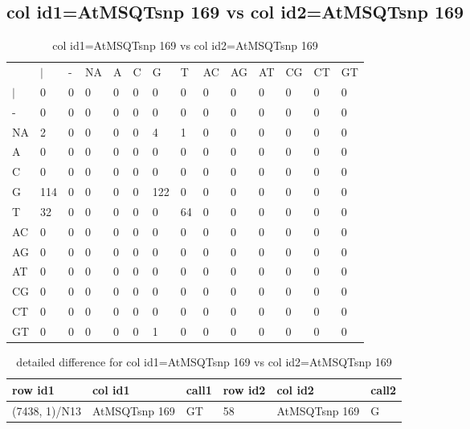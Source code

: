 \subsection{col id1=AtMSQTsnp 169 vs col id2=AtMSQTsnp 169}
\begin{center}
\begin{longtable}{|l|l|l|l|l|l|l|l|l|l|l|l|l|l|}
\caption{col id1=AtMSQTsnp 169 vs col id2=AtMSQTsnp 169} \label{table_dm736}\\
\hline
\\
\hline
&$|$&-&NA&A&C&G&T&AC&AG&AT&CG&CT&GT\\
$|$&0&0&0&0&0&0&0&0&0&0&0&0&0\\
-&0&0&0&0&0&0&0&0&0&0&0&0&0\\
NA&2&0&0&0&0&4&1&0&0&0&0&0&0\\
A&0&0&0&0&0&0&0&0&0&0&0&0&0\\
C&0&0&0&0&0&0&0&0&0&0&0&0&0\\
G&114&0&0&0&0&122&0&0&0&0&0&0&0\\
T&32&0&0&0&0&0&64&0&0&0&0&0&0\\
AC&0&0&0&0&0&0&0&0&0&0&0&0&0\\
AG&0&0&0&0&0&0&0&0&0&0&0&0&0\\
AT&0&0&0&0&0&0&0&0&0&0&0&0&0\\
CG&0&0&0&0&0&0&0&0&0&0&0&0&0\\
CT&0&0&0&0&0&0&0&0&0&0&0&0&0\\
GT&0&0&0&0&0&1&0&0&0&0&0&0&0\\
\hline
\end{longtable}
\end{center}

\begin{center}
\begin{longtable}{|l|l|l|l|l|l|}
\caption{detailed difference for col id1=AtMSQTsnp 169 vs col id2=AtMSQTsnp 169} \label{table_dm737}\\
\hline
row id1&col id1&call1&row id2&col id2&call2\\
\hline
(7438, 1)/N13&AtMSQTsnp 169&GT&58&AtMSQTsnp 169&G\\
\hline
\end{longtable}
\end{center}

